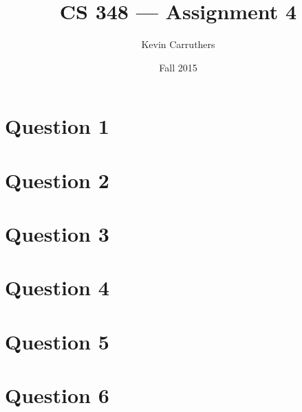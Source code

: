 \documentclass[12pt]{article}
\begin{document}
\title{CS 348 --- Assignment 4}
\author{Kevin Carruthers}
\date{\vspace{-2ex}Fall 2015}
\maketitle\HRule

\section{Question 1}


\section{Question 2}


\section{Question 3}


\section{Question 4}


\section{Question 5}


\section{Question 6}

\end{document}
